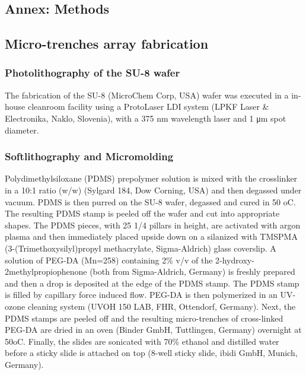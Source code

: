 \documentclass[pdftex,12pt,a4paper]{report}
\begin{document}
\begin{appendices}

\chapter{Annex: Methods}

\section*{Micro-trenches array fabrication} \label{appendix:microtrench}

\subsection*{Photolithography of the SU-8 wafer}

The fabrication of the SU-8 (MicroChem Corp, USA) wafer was executed in a in-house cleanroom facility using a ProtoLaser LDI system (LPKF Laser \& Electronika, Naklo, Slovenia), with a 375 nm wavelength laser and 1 μm spot diameter.

\subsection*{Softlithography and Micromolding}

Polydimethylsiloxane (PDMS) prepolymer solution is mixed with the crosslinker in a 10:1 ratio (w/w) (Sylgard 184, Dow Corning, USA) and then degassed under vacuum. PDMS is then purred on the SU-8 wafer, degassed and cured in 50 oC. The resulting PDMS stamp is peeled off the wafer and cut into appropriate shapes. The PDMS pieces, with 25 1/4 pillars in height, are activated with argon plasma and then immediately placed upside down on a silanized with TMSPMA (3-(Trimethoxysilyl)propyl methacrylate, Sigma-Aldrich) glass coverslip. A solution of PEG-DA (Mn=258) containing 2\% v/v of the 2-hydroxy-2methylpropiophenone (both from Sigma-Aldrich, Germany) is freshly prepared and then a drop is deposited at the edge of the PDMS stamp. The PDMS stamp is filled by capillary force induced flow. PEG-DA is then polymerized in an UV-ozone cleaning system (UVOH 150 LAB, FHR, Ottendorf, Germany). Next, the PDMS stamps are peeled off and the resulting micro-trenches of cross-linked PEG-DA are dried in an oven (Binder GmbH, Tuttlingen, Germany) overnight at 50oC. Finally, the slides are sonicated with 70\% ethanol and distilled water before a sticky slide is attached on top (8-well sticky slide, ibidi GmbH, Munich, Germany).


\end{appendices}
\end{document}

